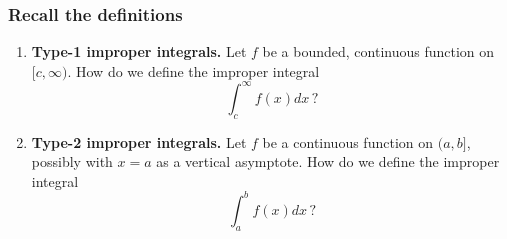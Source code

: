 \documentclass[14pt]{beamer}
\date{}
\title{}
\author{}
\newcommand {\DS} [1] {${\displaystyle #1}$}
\begin{document}
\begin{frame}[t]
\frametitle{Recall the definitions}

\begin{enumerate}

	\item  {\bf Type-1 improper integrals.}  Let $f$ be a bounded, continuous function on \DS{[c, \infty)}.  How do we define the improper integral
		$$
			\int_c^{\infty} f(x) dx \, ?
		$$
	
	\vfill
	
	\item {\bf Type-2 improper integrals.}  Let $f$ be a continuous function on \DS{(a,b]}, possibly with $x=a$ as a vertical asymptote.  How do we define the improper integral
		$$
			\int_a^{b} f(x) dx  \, ?
		$$
	
	\vfill
	
	
\end{enumerate}

\end{frame}
\end{document}
